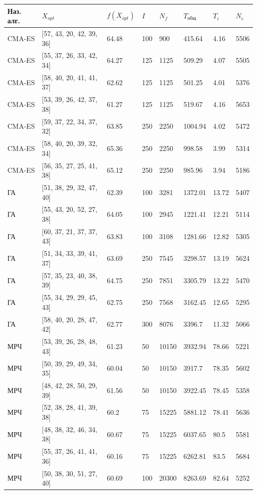 \noindent %
\begin{minipage}{\textwidth}
	\vspace{\mfloatsep} %
	\centering\small
	\label{tab:opt-res}
	\begin{tabular}{|l|l|l|l|l|l|l|l|}
	\hline
	Наз. алг.&$X_{opt}$&$f(X_{opt})$&$I$&$N_{f}$&$T_{\text{общ}}$&$T_{i}$&$N_{e}$\\
	\hline
	CMA-ES&[57, 43, 20, 42, 39, 36]&64.48&100&900&415.64&4.16&5506\\ \hline
	CMA-ES&[55, 37, 26, 33, 42, 34]&64.27&125&1125&509.29&4.07&5505\\ \hline
	CMA-ES&[58, 40, 20, 41, 41, 37]&62.62&125&1125&501.25&4.01&5376\\ \hline
	CMA-ES&[53, 39, 26, 42, 37, 38]&61.27&125&1125&519.67&4.16&5653\\ \hline
	CMA-ES&[59, 37, 22, 34, 37, 32]&63.85&250&2250&1004.94&4.02&5472\\ \hline
	CMA-ES&[58, 40, 20, 39, 32, 34]&65.36&250&2250&998.58&3.99&5314\\ \hline
	CMA-ES&[56, 35, 27, 25, 41, 38]&65.12&250&2250&985.96&3.94&5186\\ \hline
	ГА&[51, 38, 29, 32, 47, 40]&62.39&100&3281&1372.01&13.72&5407 \\ \hline
	ГА&[55, 43, 20, 52, 27, 38]&64.05&100&2945&1221.41&12.21&5114\\ \hline
	ГА&[60, 37, 21, 37, 37, 43]&63.83&100&3108&1281.66&12.82&5305\\ \hline
	ГА&[51, 34, 33, 39, 41, 37]&63.69&250&7545&3298.57&13.19&5624\\ \hline
	ГА&[57, 35, 23, 40, 38, 39]&64.75&250&7851&3305.79&13.22&5470\\ \hline
	ГА&[55, 34, 29, 29, 45, 43]&62.75&250&7568&3162.45&12.65&5295\\ \hline
	ГА&[58, 40, 20, 28, 47, 42]&62.77&300&8076&3396.7&11.32&5066\\ \hline
	МРЧ&[53, 39, 26, 28, 48, 43]&61.23&50&10150&3932.94&78.66&5221\\ \hline
	МРЧ&[50, 39, 29, 49, 34, 35]&60.04&50&10150&3917.7&78.35&5602\\ \hline
	МРЧ&[48, 42, 28, 50, 29, 39]&61.56&50&10150&3922.45&78.45&5358\\ \hline
	МРЧ&[52, 38, 28, 41, 39, 38]&60.2&75&15225&5881.12&78.41&5636\\ \hline
	МРЧ&[48, 38, 32, 46, 34, 38]&60.67&75&15225&6037.65&80.5&5581\\ \hline
	МРЧ&[55, 37, 26, 41, 41, 36]&60.16&75&15225&6262.81&83.5&5684\\ \hline
	МРЧ&[50, 38, 30, 51, 27, 40]&60.69&100&20300&8263.69&82.64&5252\\ \hline		
	\end{tabular}
\vspace{\mfloatsep} %
\normalsize %
\end{minipage}